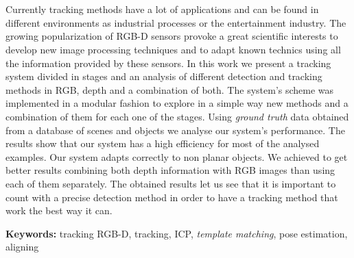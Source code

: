 \chapter*{\runtitle}


\noindent Currently tracking methods have a lot of applications and can be found in different environments as industrial processes or the entertainment industry. The growing popularization of RGB-D sensors provoke a great scientific interests to develop new image processing techniques and to adapt known technics using all the information provided by these sensors. In this work we present a tracking system divided in stages and an analysis of different detection and tracking methods in RGB, depth and a combination of both. The system's scheme was implemented in a modular fashion to explore in a simple way new methods and a combination of them for each one of the stages. Using \textit{ground truth} data obtained from a database of scenes and objects we analyse our system's performance. The results show that our system has a high efficiency for most of the analysed examples. Our system adapts correctly to non planar objects. We achieved to get better results combining both depth information with RGB images than using each of them separately. The obtained results let us see that it is important to count with a precise detection method in order to have a tracking method that work the best way it can.


\bigskip

\noindent\textbf{Keywords:} tracking RGB-D, tracking, ICP, \textit{template matching}, pose estimation, aligning



